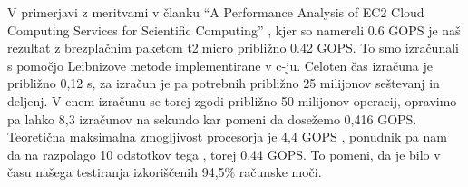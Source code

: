 V primerjavi z meritvami v članku ``A Performance Analysis of EC2 Cloud Computing Services for Scientific Computing'' \cite{3_ostermann2009performance}, kjer so namereli 0.6 GOPS je naš rezultat z brezplačnim paketom t2.micro približno 0.42 GOPS.
To smo izračunali s pomočjo Leibnizove metode implementirane v c-ju.
Celoten čas izračuna je približno 0,12 s, za izračun je pa potrebnih približno 25 milijonov seštevanj in deljenj.
V enem izračunu se torej zgodi približno 50 milijonov operacij, opravimo pa lahko 8,3 izračunov na sekundo kar pomeni da dosežemo 0,416 GOPS.
Teoretična maksimalna zmogljivost procesorja je 4,4 GOPS \cite{3_ostermann2009performance}, ponudnik pa nam da na razpolago 10 odstotkov tega \cite{3_10odstotkov}, torej 0,44 GOPS.
To pomeni, da je bilo v času našega testiranja izkoriščenih 94,5\% računske moči.


